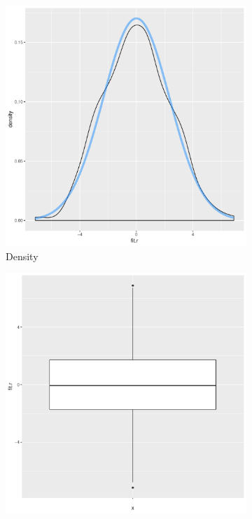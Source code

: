 \documentclass[11pt,openany]{book}
\begin{document}
\begin{figure}
\begin{subfigure}[b]{0.4\textwidth}
                \includegraphics[width=\textwidth]{../15_Diagnostics/multresidden.pdf} %
                \caption{Density \label{fig:multresidden}}
        \end{subfigure}
        \begin{subfigure}[b]{0.4\textwidth}
                \centering
                \includegraphics[width=\textwidth]{../15_Diagnostics/multresidbox.pdf} %

\end{subfigure}
\end{figure}
\end{document}
